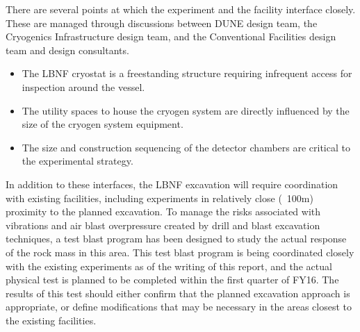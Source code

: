 There are several points at which the experiment and the facility interface closely. These are managed through discussions between DUNE design team, the Cryogenics Infrastructure design team, and the Conventional Facilities design team and design consultants.
\begin{itemize}
\item The LBNF cryostat is a freestanding structure requiring infrequent access for inspection around the vessel. 
\item The utility spaces to house the cryogen system are directly influenced by the size of the cryogen system equipment.
\item The size and construction sequencing of the detector chambers are critical to the experimental strategy.
\end{itemize}

In addition to these interfaces, the LBNF excavation will require coordination with existing facilities, including experiments in relatively close (~100m) proximity to the planned excavation.  To manage the risks associated with vibrations and air blast overpressure created by drill and blast excavation techniques, a test blast program has been designed to study the actual response of the rock mass in this area.  This test blast program is being coordinated closely with the existing experiments as of the writing of this report, and the actual physical test is planned to be completed within the first quarter of FY16.  The results of this test should either confirm that the planned excavation approach is appropriate, or define modifications that may be necessary in the areas closest to the existing facilities.





